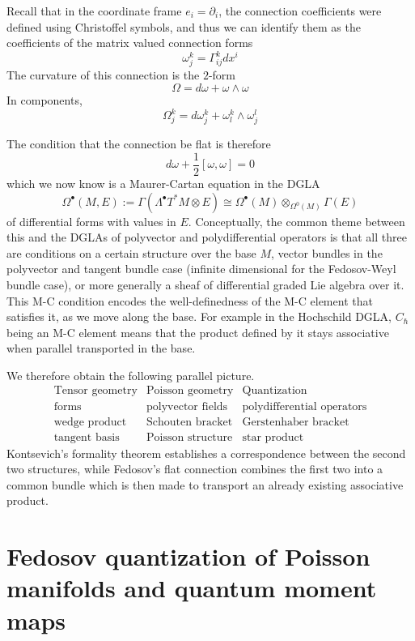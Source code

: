 \documentclass[
  12pt,
  a4paper, oneside
]{report}
\renewcommand{\hbar}{\hslash}
\theoremstyle{bolddef}
\theoremstyle{remark}
\numberwithin{equation}{chapter}
\begin{document}
Recall that in the coordinate frame $e_i = \partial_i$, the connection coefficients were defined using Christoffel symbols, and thus we can identify them as the coefficients of the matrix valued connection forms 
\[
\omega^k_{j} = \Gamma^k_{ij} dx^i 
\]
The curvature of this connection is the $2$-form
\[
\Omega = d\omega + \omega \wedge \omega 
\]
In components,
\[
\Omega^k_{j}
=
d\omega^k_{j}
+
\omega^k_{l}\wedge \omega^l_{j}
\]

The condition that the connection be flat is therefore
\[
d\omega + \frac12[\omega,\omega] = 0 
\]
which we now know is a Maurer-Cartan equation in the DGLA
\[
\Omega^{\bullet}(M,E) := \Gamma(\Lambda^{\bullet}T^{*}M\otimes E) \cong\Omega^{\bullet}(M)\otimes_{\Omega^{0}(M)}\Gamma(E)
\]
of differential forms with values in $E$.
Conceptually, the common theme between this and the DGLAs of polyvector and polydifferential operators is that all three are conditions on a certain structure over the base $M$, vector bundles in the polyvector and tangent bundle case (infinite dimensional for the Fedosov-Weyl bundle case), or more generally a sheaf of differential graded Lie algebra over it. \\
This M-C condition encodes the well-definedness of the M-C element that satisfies it, as we move along the base. For example in the Hochschild DGLA, $C_{\hbar}$ being an M-C element means that the product defined by it stays associative when parallel transported in the base. 
\bigskip


We therefore obtain the following parallel picture.
\[
\begin{array}{c|c|c}
  \text{Tensor geometry} & \text{Poisson geometry} & \text{Quantization} \\
\hline
  \text{forms} & \text{polyvector fields} & \text{polydifferential operators} \\
  \text{wedge product} & \text{Schouten bracket} & \text{Gerstenhaber bracket} \\
  \text{tangent basis}&\text{Poisson structure} & \text{star product}
\end{array}
\]
Kontsevich's formality theorem establishes a correspondence between the second two structures, while Fedosov's flat connection combines the first two into a common bundle which is then made to transport an already existing associative product. 

\chapter{Fedosov quantization of Poisson manifolds and quantum moment maps}
\end{document}
